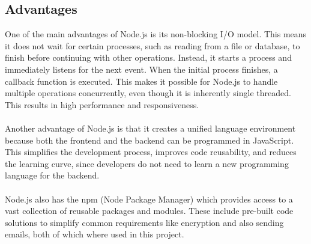 \documentclass[a4paper,12pt]{report}
\begin{document}
\subsection{Advantages}  
One of the main advantages of Node.js is its non-blocking I/O model. This means it does not wait for certain processes, such as reading from a file or database, to finish before continuing with other operations. Instead, it starts a process and immediately listens for the next event. When the initial process finishes, a callback function is executed. This makes it possible for Node.js to handle multiple operations concurrently, even though it is inherently single threaded. This results in high performance and responsiveness. \parencite{nodejs-nonblocking}\\\\
Another advantage of Node.js is that it creates a unified language environment because both the frontend and the backend can be programmed in JavaScript. This simplifies the development process, improves code reusability, and reduces the learning curve, since developers do not need to learn a new programming language for the backend.\\\\
Node.js also has the npm (Node Package Manager) which provides access to a vast collection of reusable packages and modules. These include pre-built code solutions to simplify common requirements like encryption and also sending emails, both of which where used in this project. \parencite{mdn-express-nodejs} \\\\
\end{document}
